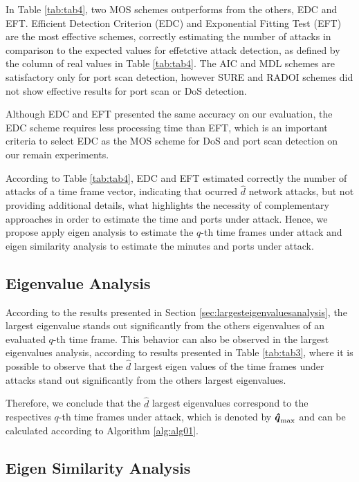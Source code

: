 \documentclass{bmcart}
\begin{document}
In Table \ref{tab:tab4}, two MOS schemes outperforms from the others, EDC and EFT. Efficient Detection Criterion (EDC) and Exponential Fitting Test (EFT) are the most effective schemes, correctly estimating the number of attacks in comparison to the expected values for effetctive attack detection, as defined by the column of real values in Table \ref{tab:tab4}. The AIC and MDL schemes are satisfactory only for port scan detection, however SURE and RADOI schemes did not show effective results for port scan or DoS detection.

Although EDC and EFT presented the same accuracy on our evaluation, the EDC scheme requires less processing time than EFT, which is an important criteria to select EDC as the MOS scheme for DoS and port scan detection on our remain experiments.

According to Table \ref{tab:tab4}, EDC and EFT estimated correctly the number of attacks of a time frame vector, indicating that ocurred $\hat{d}$ network attacks, but not providing additional details, what highlights the necessity of complementary approaches in order to estimate the time and ports under attack. Hence, we propose apply eigen analysis to estimate the $q$-th time frames under attack and eigen similarity analysis to estimate the minutes and ports under attack.

\subsection{Eigenvalue Analysis}
\label{sec:EigenvalueAnalysis}

According to the results presented in Section \ref{sec:largesteigenvaluesanalysis}, the largest eigenvalue stands out significantly from the others eigenvalues of an evaluated $q$-th time frame. This behavior can also be observed in the largest eigenvalues analysis, according to results presented in Table \ref{tab:tab3}, where it is possible to observe that the $\hat{d}$ largest eigen values of the time frames under attacks stand out significantly from the others largest eigenvalues. 

Therefore, we conclude that the $\hat{d}$ largest eigenvalues correspond to the respectives $q$-th time frames under attack, which is denoted by $\rm{\boldsymbol{\hat{q}}}_{\rm max}$ and can be calculated according to Algorithm \ref{alg:alg01}.

\subsection{Eigen Similarity Analysis}
\label{sec:EigenSimilarityAnalysis}
\end{document}
